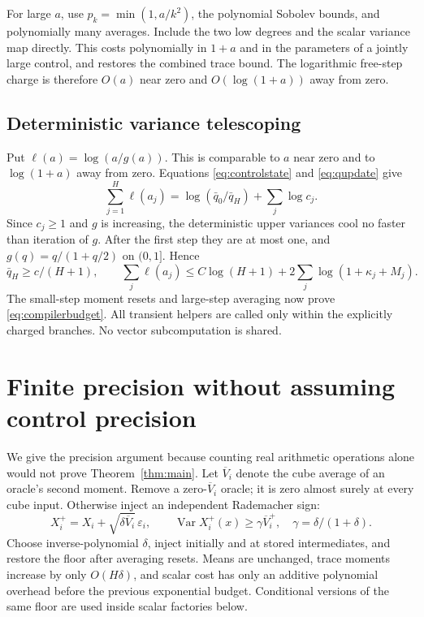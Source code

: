 \documentclass[11pt]{article}
\theoremstyle{remark}\newtheorem{remark}[theorem]{Remark}
\begin{document}
For large $a$, use $p_k=\min(1,a/k^2)$, the polynomial Sobolev bounds,
and polynomially many averages. Include the two low degrees and the
scalar variance map directly. This costs polynomially in $1+a$ and
in the parameters of a jointly large control, and restores the combined
trace bound. The logarithmic free-step charge is therefore
$O(a)$ near zero and $O(\log(1+a))$ away from zero.

\subsection{Deterministic variance telescoping}

Put $\ell(a)=\log(a/g(a))$. This is comparable to $a$ near zero and
to $\log(1+a)$ away from zero. Equations \eqref{eq:controlstate} and
\eqref{eq:qupdate} give
\[
 \sum_{j=1}^H\ell(a_j)
 =\log(\bar q_0/\bar q_H)+\sum_j\log c_j.
\]
Since $c_j\ge1$ and $g$ is increasing, the deterministic upper variances
cool no faster than iteration of $g$. After the first step they are at
most one, and $g(q)=q/(1+q/2)$ on $(0,1]$. Hence
\[
 \bar q_H\ge c/(H+1),\qquad
 \sum_j\ell(a_j)\le C\log(H+1)+2\sum_j\log(1+\kappa_j+M_j).
\]
The small-step moment resets and large-step averaging now prove
\eqref{eq:compilerbudget}. All transient helpers are called only within
the explicitly charged branches. No vector subcomputation is shared.

\section{Finite precision without assuming control precision}

We give the precision argument because counting real arithmetic operations
alone would not prove Theorem~\ref{thm:main}. Let $\overline V_i$ denote
the cube average of an oracle's second moment. Remove a zero-$\overline V_i$
oracle; it is zero almost surely at every cube input. Otherwise inject an
independent Rademacher sign:
\begin{equation}\label{eq:floor}
 X_i^+=X_i+\sqrt{\delta\overline V_i}\,\varepsilon_i,
 \qquad
 \operatorname{Var}X_i^+(x)\ge
 \gamma\overline V_i^+,\quad\gamma=\delta/(1+\delta).
\end{equation}
Choose inverse-polynomial $\delta$, inject initially and at stored
intermediates, and restore the floor after averaging resets. Means are
unchanged, trace moments increase by only $O(H\delta)$, and scalar cost
has only an additive polynomial overhead before the previous exponential
budget. Conditional versions of the same floor are used inside scalar
factories below.
\end{document}
